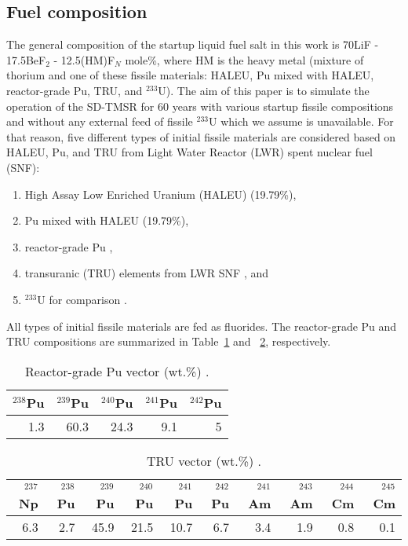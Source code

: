 \subsection{Fuel composition}
The general composition of the startup liquid fuel salt in this work is 70LiF - 
17.5BeF$_2$ - 12.5(HM)F$_N$ mole\%, where HM is the heavy metal (mixture of 
thorium and one of these fissile materials: \gls{HALEU}, Pu mixed with \gls{HALEU}, reactor-grade Pu, \gls{TRU}, and $^{233}$U).
The aim of this paper is to simulate the  
operation of the \gls{SD-TMSR} for 60 years with various startup fissile 
compositions and without any external feed of fissile $^{233}$U which we 
assume is unavailable. For that reason, five different types of initial 
fissile materials are considered based on \gls{HALEU}, Pu, and \gls{TRU} from Light Water
Reactor (LWR) spent nuclear fuel (SNF):
\begin{enumerate}[label=(\alph*)]
	\item High Assay Low Enriched Uranium (HALEU) (19.79\%),
	\item Pu mixed with \gls{HALEU} (19.79\%),
	\item reactor-grade Pu \cite{marka1993explosive},
	\item transuranic (TRU) elements from LWR SNF \cite{de2000scenarios}, and
	\item $^{233}$U for comparison \cite{ashraf2019whole_core}.
\end{enumerate}
All types of initial fissile materials are fed as fluorides.
The reactor-grade Pu and \gls{TRU} compositions are summarized in 
Table~\ref{tab:table2} and ~\ref{tab:table3}, respectively.

\begin{table}  %
	\caption{Reactor-grade Pu vector (wt.\%) \cite{marka1993explosive}.}
	\vspace{0.1in}
	\begin{tabularx}{\textwidth}{r r r r r}
		\hline
		$^{238}$Pu & $^{239}$Pu & $^{240}$Pu & $^{241}$Pu & $^{242}$Pu \\
		\hline
		 1.3&60.3&24.3&9.1&5 \\
		\hline
	\end{tabularx}
	\label{tab:table2}
\end{table}

\begin{table}  %
	\caption{\gls{TRU} vector (wt.\%) \cite{de2000scenarios}.}
	\vspace{0.1in}
	\begin{tabularx}{\textwidth}{r r r r r r r r r r}
		\hline
		$^{237}$Np&$^{238}$Pu & $^{239}$Pu & $^{240}$Pu & $^{241}$Pu & $^{242}$Pu&$^{241}$Am &$^{243}$Am&$^{244}$Cm &$^{245}$Cm\\
		\hline
		6.3&2.7&45.9&21.5&10.7&6.7&3.4&1.9&0.8&0.1 \\
		\hline
	\end{tabularx}
	\label{tab:table3}
\end{table}


